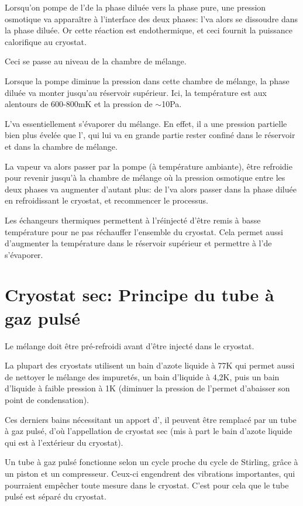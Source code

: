 Lorsqu'on pompe de l'\HeT de la phase diluée vers la phase pure, une pression osmotique va apparaître à l'interface des deux phases: l'\HeT va alors se dissoudre dans la phase diluée. Or cette réaction est endothermique, et ceci fournit la puissance calorifique au cryostat.

Ceci se passe au niveau de la chambre de mélange.\par

Lorsque la pompe diminue la pression dans cette chambre de mélange, la phase diluée va monter jusqu'au réservoir supérieur. Ici, la température est aux alentours de 600-800mK et la pression de $\sim$10Pa.

L'\HeT va essentiellement s'évaporer du mélange. En effet, il a une pression partielle bien plus évelée que l'\HeQ, qui lui va en grande partie rester confiné dans le réservoir et dans la chambre de mélange.
\par

La vapeur va alors passer par la pompe (à température ambiante), être refroidie pour revenir jusqu'à la chambre de mélange où la pression osmotique entre les deux phases va augmenter d'autant plus: de l'\HeT va alors passer dans la phase diluée en refroidissant le cryostat, et recommencer le processus. \par

Les échangeurs thermiques permettent à l'\HeT réinjecté d'être remis à basse température pour ne pas réchauffer l'ensemble du cryostat. Cela permet aussi d'augmenter la température dans le réservoir supérieur et permettre à l'\HeT de s'évaporer.

\section{Cryostat sec: Principe du tube à gaz pulsé}
Le mélange doit être pré-refroidi avant d'être injecté dans le cryostat.\par
La plupart des cryostats utilisent un bain d'azote liquide à 77K qui permet aussi de nettoyer le mélange des impuretés, un bain d'\HeQ liquide à 4,2K, puis un bain d'\HeQ liquide à faible pression à 1K (diminuer la pression de l'\HeQ permet d'abaisser son point de condensation).

Ces derniers bains nécessitant un apport d'\HeQ, il peuvent être remplacé par un tube à gaz pulsé, d'où l'appellation de cryostat sec (mis à part le bain d'azote liquide qui est à l'extérieur du cryostat).

Un tube à gaz pulsé fonctionne selon un cycle proche du cycle de Stirling, grâce à un piston et un compresseur. Ceux-ci engendrent des vibrations importantes, qui pourraient empêcher toute mesure dans le cryostat. C'est pour cela que le tube pulsé est séparé du cryostat.

